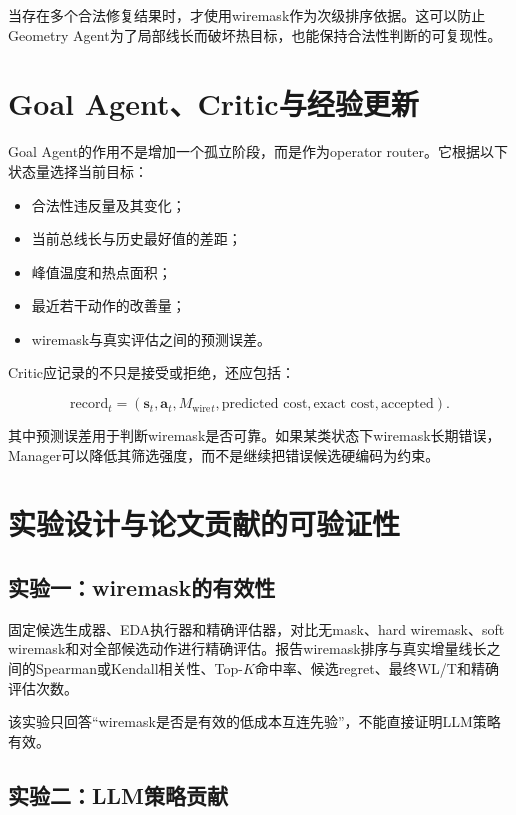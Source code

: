 \documentclass[UTF8,a4paper,12pt]{ctexart}
\newcommand{\state}{\boldsymbol{s}}
\newcommand{\action}{\boldsymbol{a}}
\newcommand{\wiremask}{M_{\mathrm{wire}}}
\begin{document}
当存在多个合法修复结果时，才使用wiremask作为次级排序依据。这可以防止Geometry Agent为了局部线长而破坏热目标，也能保持合法性判断的可复现性。

\section{Goal Agent、Critic与经验更新}

Goal Agent的作用不是增加一个孤立阶段，而是作为operator router。它根据以下状态量选择当前目标：

\begin{itemize}[leftmargin=2.5em]
  \item 合法性违反量及其变化；
  \item 当前总线长与历史最好值的差距；
  \item 峰值温度和热点面积；
  \item 最近若干动作的改善量；
  \item wiremask与真实评估之间的预测误差。
\end{itemize}

Critic应记录的不只是接受或拒绝，还应包括：

\begin{equation}
\text{record}_t=(\state_t,\action_t,\wiremask{}_t,
\text{predicted cost},\text{exact cost},\text{accepted}).
\end{equation}

其中预测误差用于判断wiremask是否可靠。如果某类状态下wiremask长期错误，Manager可以降低其筛选强度，而不是继续把错误候选硬编码为约束。

\section{实验设计与论文贡献的可验证性}

\subsection{实验一：wiremask的有效性}

固定候选生成器、EDA执行器和精确评估器，对比无mask、hard wiremask、soft wiremask和对全部候选动作进行精确评估。报告wiremask排序与真实增量线长之间的Spearman或Kendall相关性、Top-$K$命中率、候选regret、最终WL/T和精确评估次数。

该实验只回答“wiremask是否是有效的低成本互连先验”，不能直接证明LLM策略有效。

\subsection{实验二：LLM策略贡献}
\end{document}
